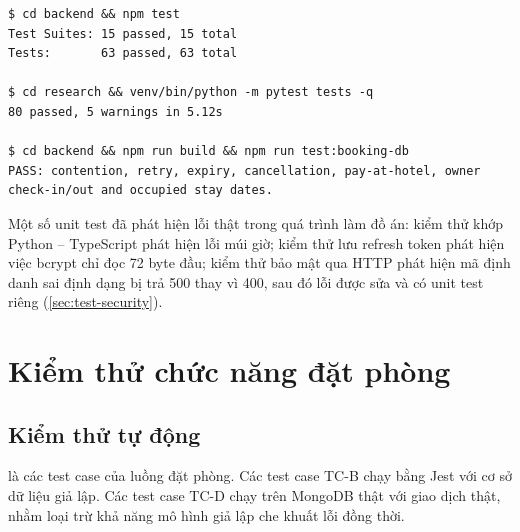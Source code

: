 \begin{lstlisting}[numbers=none, language={}, caption={Lệnh chạy unit test và kết quả}, label={lst:unit-run}]
$ cd backend && npm test
Test Suites: 15 passed, 15 total
Tests:       63 passed, 63 total

$ cd research && venv/bin/python -m pytest tests -q
80 passed, 5 warnings in 5.12s

$ cd backend && npm run build && npm run test:booking-db
PASS: contention, retry, expiry, cancellation, pay-at-hotel, owner check-in/out and occupied stay dates.
\end{lstlisting}

Một số unit test đã phát hiện lỗi thật trong quá trình làm đồ án: kiểm thử khớp Python -- TypeScript phát hiện lỗi múi giờ; kiểm thử lưu refresh token phát hiện việc bcrypt chỉ đọc 72 byte đầu; kiểm thử bảo mật qua HTTP phát hiện mã định danh sai định dạng bị trả 500 thay vì 400, sau đó lỗi được sửa và có unit test riêng (\cref{sec:test-security}).

\section{Kiểm thử chức năng đặt phòng}\label{sec:test-booking}

\subsection{Kiểm thử tự động}

 là các test case của luồng đặt phòng. Các test case TC-B chạy bằng Jest với cơ sở dữ liệu giả lập. Các test case TC-D chạy trên MongoDB thật với giao dịch thật, nhằm loại trừ khả năng mô hình giả lập che khuất lỗi đồng thời.

